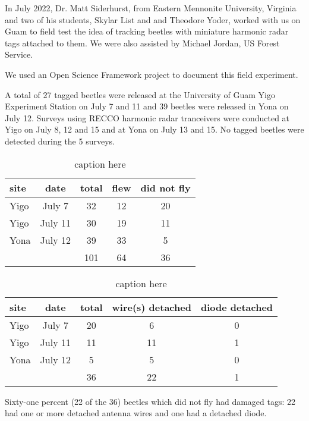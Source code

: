 \documentclass[12pt,letterpaper,english,bibliography=totocnumbered, abstract=on]{scrartcl}
\begin{document}
In July 2022, Dr. Matt Siderhurst, from Eastern Mennonite University, Virginia and two of his students, Skylar List and and Theodore Yoder, worked with us on Guam to field test the idea of tracking beetles with miniature harmonic radar tags attached to them. We were also assisted by Michael Jordan, US Forest Service.

We used an Open Science Framework project \cite{Moore_Yoder_Cayanan_List_2023} to document this field experiment.

A total of 27 tagged beetles were released at the University of Guam Yigo Experiment Station on July 7 and 11 and 39 beetles were released in Yona on July 12. Surveys using RECCO harmonic radar tranceivers were conducted at Yigo on July 8, 12 and 15 and at Yona on July 13 and 15. No tagged beetles were detected during the 5 surveys.

\begin{table}[!ht]
	\centering
	\caption{caption here}
	\label{table1}
	\begin{tabular}{lcccc}
		\hline
		site & date & total & flew & did not fly \\ \hline
		Yigo & July 7 & 32 & 12 & 20 \\
		Yigo & July 11 & 30 & 19 & 11 \\
		Yona & July 12 & 39 & 33 & 5 \\ \hline
		~ & ~ & 101 & 64 & 36 \\ \hline
	\end{tabular}
\end{table}

\begin{table}[!ht]
	\centering
	\caption{caption here}
	\label{table2}
	\begin{tabular}{lcccc}
		\hline
		site & date & total & wire(s) detached & diode detached \\ \hline
		Yigo & July 7 & 20 & 6 & 0 \\
		Yigo & July 11 & 11 & 11 & 1 \\
		Yona & July 12 & 5 & 5 & 0 \\ \hline
		~ & ~ & 36 & 22 & 1 \\ \hline
	\end{tabular}
\end{table}




Sixty-one percent (22 of the 36) beetles which did not fly had damaged tags: 22 had one or more detached antenna wires and one had a detached diode.

\printbibliography
\end{document}
